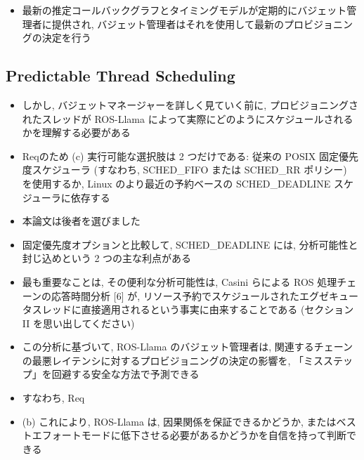 \begin{frame}{}
    \begin{itemize}
        \item 最新の推定コールバックグラフとタイミングモデルが定期的にバジェット管理者に提供され, バジェット管理者はそれを使用して最新のプロビジョニングの決定を行う
    \end{itemize}
\end{frame}


\subsection{Predictable Thread Scheduling}
\label{ssec: predictable thread scheduling}

\begin{frame}{}
    \begin{itemize}
        \item しかし, バジェットマネージャーを詳しく見ていく前に, プロビジョニングされたスレッドが ROS-Llama によって実際にどのようにスケジュールされるかを理解する必要がある
\item Reqのため (c) 実行可能な選択肢は 2 つだけである: 従来の POSIX 固定優先度スケジューラ (すなわち, SCHED\_FIFO または SCHED\_RR ポリシー) を使用するか, Linux のより最近の予約ベースの SCHED\_DEADLINE スケジューラに依存する
\item 本論文は後者を選びました
    \end{itemize}
\end{frame}

\begin{frame}{}
    \begin{itemize}
        \item 固定優先度オプションと比較して, SCHED\_DEADLINE には, 分析可能性と封じ込めという 2 つの主な利点がある
\item 最も重要なことは, その便利な分析可能性は, Casini らによる ROS 処理チェーンの応答時間分析 [6] が, リソース予約でスケジュールされたエグゼキュータスレッドに直接適用されるという事実に由来することである (セクション II を思い出してください)
\item この分析に基づいて, ROS-Llama のバジェット管理者は, 関連するチェーンの最悪レイテンシに対するプロビジョニングの決定の影響を, 「ミスステップ」を回避する安全な方法で予測できる
\item すなわち, Req
\item (b) これにより, ROS-Llama は, 因果関係を保証できるかどうか, またはベストエフォートモードに低下させる必要があるかどうかを自信を持って判断できる
    \end{itemize}
\end{frame}

